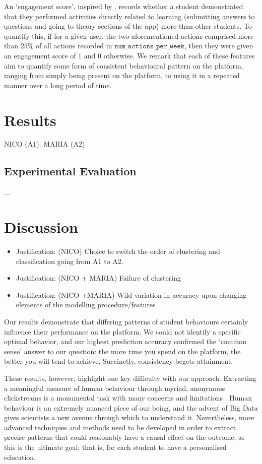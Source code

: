 \documentclass[sigplan,screen]{acmart}
\begin{document}
An `engagement score', inspired by \cite{student_engagement}, records whether a student demonstrated that they performed activities directly related to learning (submitting answers to questions and going to theory sections of the app) more than other students. To quantify this, if for a given user, the two aforementioned actions comprised more than $25\%$ of all actions recorded in $\texttt{num\_actions\_per\_week}$, then they were given an engagement score of $1$ and $0$ otherwise. We remark that each of these features aim to quantify some form of consistent behavioural pattern on the platform, ranging from simply being present on the platform, to using it in a repeated manner over a long period of time. 

\section{Results}\label{sec:results}
{\color{red}NICO (A1), MARIA (A2)}
\subsection{Experimental Evaluation}\label{subsec:eval}
{\color{red}...}


\section{Discussion}\label{sec:discussion}

{\color{red}
\begin{itemize}
\item Justification: (NICO) Choice to switch the order of clustering and classification going from A1 to A2. 
    \item Justification: (NICO + MARIA) Failure of clustering
    \item Justification: (NICO +MARIA) Wild variation in accuracy upon changing elements of the modelling procedure/features
\end{itemize}

}

Our results demonstrate that differing patterns of student behaviours certainly influence their performance on the platform. We could not identify a specific optimal behavior, and our highest prediction accuracy confirmed the `common sense' answer to our question: the more time you spend on the platform, the better you will tend to achieve. Succinctly, consistency begets attainment. 

These results, however, highlight one key difficulty with our approach. Extracting a meaningful measure of human behaviour through myriad, anonymous clickstreams is a monumental task with many concerns and limitations \cite{meaningfulmeasures}. Human behaviour is an extremely nuanced piece of our being, and the advent of Big Data gives scientists a new avenue through which to understand it. Nevertheless, more advanced techniques and methods need to be developed in order to extract precise patterns that could reasonably have a causal effect on the outcome, as this is the ultimate goal; that is, for each student to have a personalised education. 
\end{document}
